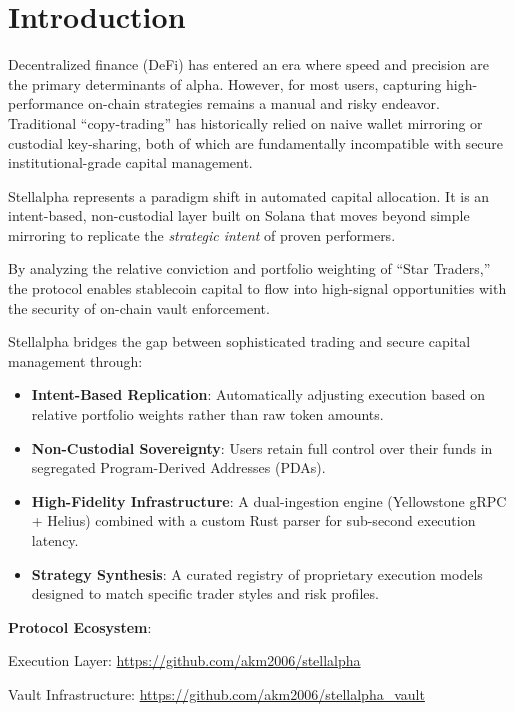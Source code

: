 \section{Introduction}

Decentralized finance (DeFi) has entered an era where speed and precision are the primary determinants of alpha. However, for most users, capturing high-performance on-chain strategies remains a manual and risky endeavor. Traditional ``copy-trading'' has historically relied on naive wallet mirroring or custodial key-sharing, both of which are fundamentally incompatible with secure institutional-grade capital management.

Stellalpha represents a paradigm shift in automated capital allocation. It is an intent-based, non-custodial layer built on Solana that moves beyond simple mirroring to replicate the \textit{strategic intent} of proven performers. 

By analyzing the relative conviction and portfolio weighting of ``Star Traders,'' the protocol enables stablecoin capital to flow into high-signal opportunities with the security of on-chain vault enforcement.

Stellalpha bridges the gap between sophisticated trading and secure capital management through:
\begin{itemize}
  \item \textbf{Intent-Based Replication}: Automatically adjusting execution based on relative portfolio weights rather than raw token amounts.
  \item \textbf{Non-Custodial Sovereignty}: Users retain full control over their funds in segregated Program-Derived Addresses (PDAs).
  \item \textbf{High-Fidelity Infrastructure}: A dual-ingestion engine (Yellowstone gRPC + Helius) combined with a custom Rust parser for sub-second execution latency.
  \item \textbf{Strategy Synthesis}: A curated registry of proprietary execution models designed to match specific trader styles and risk profiles.
\end{itemize}

\textbf{Protocol Ecosystem}:

\noindent Execution Layer: \url{https://github.com/akm2006/stellalpha}

\noindent Vault Infrastructure: \url{https://github.com/akm2006/stellalpha_vault}
